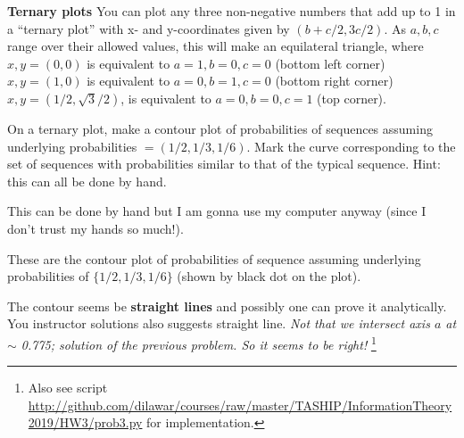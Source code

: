 \documentclass[twocolumn,answers]{exam}
\begin{document}
\begin{questions}
\bonusquestion[10] \textbf{Ternary plots}
You can plot any three non-negative numbers that add up to 1 in a “ternary plot” with
x- and y-coordinates given by $(b + c/2, 3c/2)$. As $a, b, c$ range over their
allowed values, this will make an equilateral triangle,
where $x, y = (0,0)$ is equivalent to ${a = 1, b = 0, c = 0}$ (bottom left corner)
$x, y = (1,0)$ is equivalent to ${a = 0, b = 1, c = 0}$ (bottom right corner)
$x, y =(1/2, \sqrt{3}/2)$, is equivalent to ${a = 0, b = 0, c = 1}$ (top
corner).

On a ternary plot, make a contour plot of probabilities of sequences assuming
underlying probabilities $=(1/2,1/3,1/6)$. Mark the curve corresponding to the
set of sequences with probabilities similar to that of the typical sequence.
Hint: this can all be done by hand.

\begin{solution}
    This can be done by hand but I am gonna use my computer anyway (since I
    don't trust my hands so much!).


    These are the contour plot of probabilities of sequence assuming underlying
    probabilities of $\{1/2, 1/3, 1/6\}$ (shown by black dot on the plot).

    The contour seems be \textbf{straight lines} and possibly one can prove it
    analytically. You instructor solutions also suggests straight line.
    \emph{Not that we intersect axis $a$ at $\sim$ 0.775; solution of the
    previous problem. So it seems to be right!}
    \footnote{Also see script
    \url{http://github.com/dilawar/courses/raw/master/TASHIP/InformationTheory2019/HW3/prob3.py}
    for implementation.}
\end{solution}
\end{questions}
\end{document}
